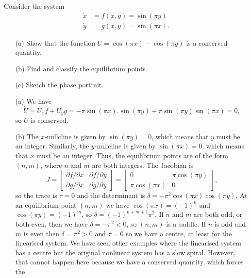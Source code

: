 \documentclass[a4paper]{amsart}
\begin{document}
\begin{exercise}\label{ex-doubly-periodic}
 Consider the system
 \begin{align*}
  \dot{x} &= f(x,y) = \sin(\pi y) \\
  \dot{y} &= g(x,y) = \sin(\pi x).
 \end{align*} 
 \begin{itemize}
  \item[(a)] Show that the function $U=\cos(\pi x)-\cos(\pi y)$ is a
   conserved quantity.
  \item[(b)] Find and classify the equilibrium points.
  \item[(c)] Sketch the phase portrait.
 \end{itemize}
\end{exercise}
\begin{solution}\leavevmode
 \begin{itemize}
  \item[(a)] We have
   \[ \dot{U} = U_xf+U_yg =
       -\pi\sin(\pi x).\sin(\pi y) +\pi\sin(\pi y)\sin(\pi x) = 0,
   \]
   so $U$ is conserved.
  \item[(b)] The $x$-nullcline is given by $\sin(\pi y)=0$, which
   means that $y$ must be an integer.  Similarly, the $y$-nullcline is
   given by $\sin(\pi x)=0$, which means that $x$ must be an integer.
   Thus, the equilibrium points are of the form $(n,m)$, where $n$ and
   $m$ are both integers.  The Jacobian is 
   \[ J = \left[\begin{array}{cc} \partial f/\partial x & \partial f/\partial y \\
               \partial g/\partial x & \partial g/\partial y \end{array}\right]
        = \left[\begin{array}{cc} 0 & \pi\cos(\pi y) \\ \pi\cos(\pi x) & 0 \end{array}\right],
   \]
   so the trace is $\tau=0$ and the determinant is
   $\delta=-\pi^2\cos(\pi x)\cos(\pi y)$.  At an equilibrium point
   $(n,m)$ we have $\cos(\pi x)=(-1)^n$ and $\cos(\pi y)=(-1)^m$, so
   $\delta=(-1)^{n+m+1}\pi^2$.  If $n$ and $m$ are both odd, or both
   even, then we have $\delta=-\pi^2<0$, so $(n,m)$ is a saddle.  If
   $n$ is odd and $m$ is even then $\delta=\pi^2>0$ and $\tau=0$ so we
   have a centre, at least for the linearised system.  We have seen
   other examples where the linearised system has a centre but the
   original nonlinear system has a slow spiral.  However, that cannot
   happen here because we have a conserved quantity, which forces the

\end{itemize}
\end{solution}
\end{document}
